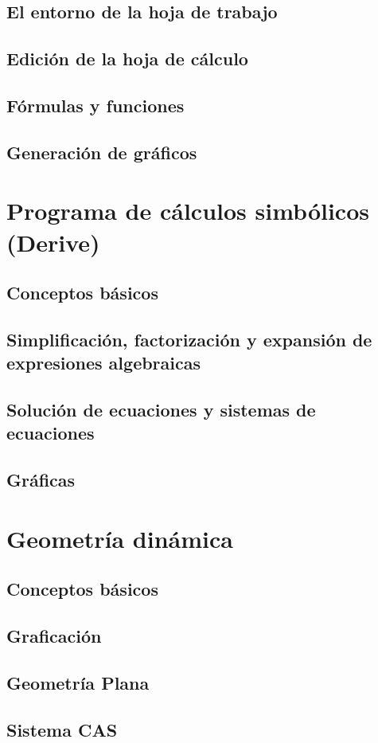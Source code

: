 \subsection{El entorno de la hoja de trabajo }
\subsection{Edición de la hoja de cálculo }
\subsection{Fórmulas y funciones }
\subsection{Generación de gráficos} 



\section{Programa de cálculos simbólicos (Derive)} %
\subsection{Conceptos básicos }
\subsection{Simplificación, factorización y expansión de expresiones algebraicas}
\subsection{Solución de ecuaciones y sistemas de ecuaciones }
\subsection{Gráficas }






\section{Geometría dinámica} %
\subsection{Conceptos básicos }
\subsection{Graficación }
\subsection{Geometría Plana}
\subsection{Sistema CAS }